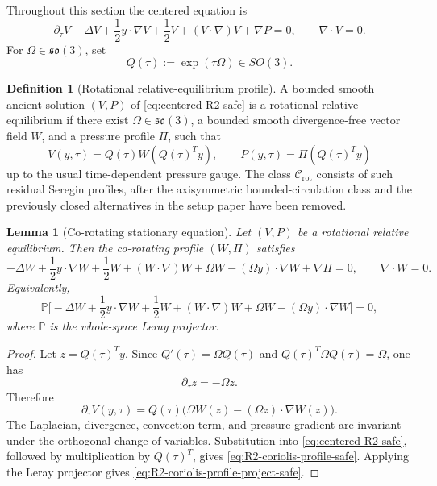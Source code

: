 \documentclass[11pt]{amsart}
\numberwithin{equation}{section}
\theoremstyle{plain}
\newtheorem{lemma}[lemma]{Lemma}
\theoremstyle{definition}
\newtheorem{definition}[definition]{Definition}
\theoremstyle{remark}
\newcommand{\Crot}{\mathcal C_{\mathrm{rot}}}
\begin{document}
Throughout this section the centered equation is
\begin{equation}\label{eq:centered-R2-safe}
   \partial_\tau V-\Delta V+\frac12 y\cdot\nabla V+\frac12 V
   +(V\cdot\nabla)V+\nabla P=0,
   \qquad \nabla\cdot V=0 .
\end{equation}
For \(\Omega\in\mathfrak{so}(3)\), set
\begin{equation}\label{eq:rotation-group-R2-safe}
   Q(\tau):=\exp(\tau\Omega)\in SO(3).
\end{equation}

\begin{definition}[Rotational relative-equilibrium profile]
\label{def:R2-relative-profile-safe}
A bounded smooth ancient solution \((V,P)\) of \eqref{eq:centered-R2-safe} is a
rotational relative equilibrium if there exist
\(\Omega\in\mathfrak{so}(3)\), a bounded smooth divergence-free vector field
\(W\), and a pressure profile \(\Pi\), such that
\begin{equation}\label{eq:R2-relative-form-safe}
   V(y,\tau)=Q(\tau)W(Q(\tau)^Ty),
   \qquad
   P(y,\tau)=\Pi(Q(\tau)^Ty)
\end{equation}
up to the usual time-dependent pressure gauge.
The class \(\Crot\) consists of such residual Seregin profiles, after the
axisymmetric bounded-circulation class and the previously closed alternatives in
the setup paper have been removed.
\end{definition}

\begin{lemma}[Co-rotating stationary equation]
\label{lem:co-rotating-equation-safe}
Let \((V,P)\) be a rotational relative equilibrium.  Then the co-rotating
profile \((W,\Pi)\) satisfies
\begin{equation}\label{eq:R2-coriolis-profile-safe}
   -\Delta W+\frac12 y\cdot\nabla W+\frac12 W
   +(W\cdot\nabla)W
   +\Omega W-(\Omega y)\cdot\nabla W
   +\nabla\Pi=0,
   \qquad \nabla\cdot W=0 .
\end{equation}
Equivalently,
\begin{equation}\label{eq:R2-coriolis-profile-project-safe}
   \mathbb P\Big[
   -\Delta W+\frac12 y\cdot\nabla W+\frac12 W
   +(W\cdot\nabla)W
   +\Omega W-(\Omega y)\cdot\nabla W
   \Big]=0,
\end{equation}
where \(\mathbb P\) is the whole-space Leray projector.
\end{lemma}

\begin{proof}
Let \(z=Q(\tau)^Ty\).  Since \(Q'(\tau)=\Omega Q(\tau)\) and
\(Q(\tau)^T\Omega Q(\tau)=\Omega\), one has
\[
   \partial_\tau z=-\Omega z.
\]
Therefore
\[
   \partial_\tau V(y,\tau)
   =Q(\tau)\Big(\Omega W(z)-(\Omega z)\cdot\nabla W(z)\Big).
\]
The Laplacian, divergence, convection term, and pressure gradient are invariant
under the orthogonal change of variables.  Substitution into
\eqref{eq:centered-R2-safe}, followed by multiplication by \(Q(\tau)^T\), gives
\eqref{eq:R2-coriolis-profile-safe}.  Applying the Leray projector gives
\eqref{eq:R2-coriolis-profile-project-safe}.
\end{proof}
\end{document}
